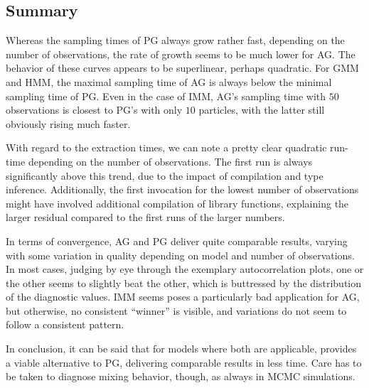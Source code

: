 \FloatBlock
\clearpage

\subsection*{Summary}

Whereas the sampling times of PG always grow rather fast, depending on the number of observations,
the rate of growth seems to be much lower for AG.  The behavior of these curves appears to be
superlinear, perhaps quadratic.  For GMM and HMM, the maximal sampling time of AG is always below
the minimal sampling time of PG.  Even in the case of IMM, AG's sampling time with \(50\)
observations is closest to PG's with only \(10\) particles, with the latter still obviously rising
much faster.

With regard to the extraction times, we can note a pretty clear quadratic run-time depending on the
number of observations.  The first run is always significantly above this trend, due to the impact
of compilation and type inference.  Additionally, the first invocation for the lowest number of
observations might have involved additional compilation of library functions, explaining the larger
residual compared to the first runs of the larger numbers.

In terms of convergence, AG and PG deliver quite comparable results, varying with some variation in
quality depending on model and number of observations.  In most cases, judging by eye through the
exemplary autocorrelation plots, one or the other seems to slightly beat the other, which is
buttressed by the distribution of the diagnostic values.  IMM seems poses a particularly bad
application for AG, but otherwise, no consistent \enquote{winner} is visible, and variations do not
seem to follow a consistent pattern.

In conclusion, it can be said that for models where both are applicable,
 provides a viable alternative to PG, delivering comparable results in
less time.  Care has to be taken to diagnose mixing behavior, though, as always in MCMC simulations.


